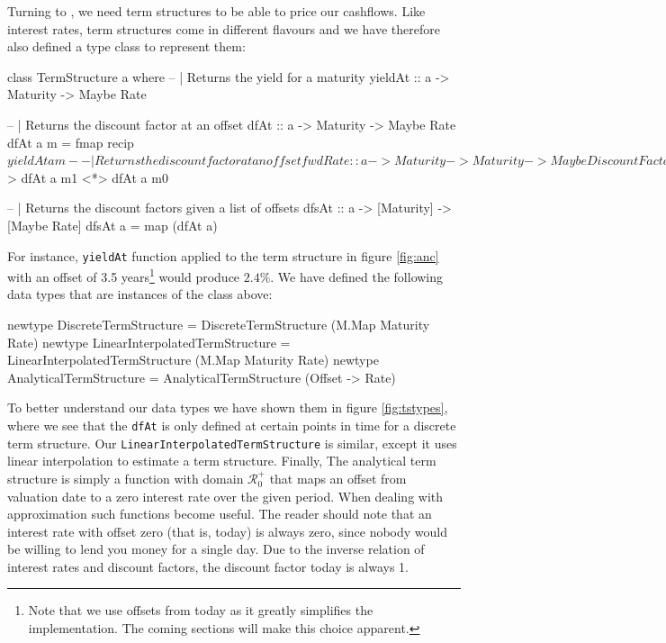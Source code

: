Turning to \hql, we need term structures to be able to price our cashflows.
Like interest rates, term structures come in different flavours and we 
have therefore also defined a type class to represent them:

\begin{hscode}
class TermStructure a where
  -- | Returns the yield for a maturity
  yieldAt :: a -> Maturity -> Maybe Rate

  -- | Returns the discount factor at an offset
  dfAt :: a -> Maturity -> Maybe Rate
  dfAt a m = fmap recip $ yieldAt a m
 
  -- | Returns the discount factor at an offset
  fwdRate :: a -> Maturity -> Maturity -> Maybe DiscountFactor
  fwdRate a m0 m1 = (/) <$> dfAt a m1 <*> dfAt a m0
  
  -- | Returns the discount factors given a list of offsets
  dfsAt :: a -> [Maturity] -> [Maybe Rate]
  dfsAt a = map (dfAt a)
\end{hscode}


For instance, \texttt{yieldAt} function applied to the term structure in
figure \ref{fig:anc} with an offset of 3.5 years\footnote{Note that we use
offsets from today as it greatly simplifies the implementation. The coming 
sections will make this choice apparent.} would produce $2.4\%$. We have
defined the following data types that are instances of the class above:

\begin{hscode}
newtype DiscreteTermStructure
  = DiscreteTermStructure (M.Map Maturity Rate)
newtype LinearInterpolatedTermStructure
  = LinearInterpolatedTermStructure (M.Map Maturity Rate)
newtype AnalyticalTermStructure
  = AnalyticalTermStructure (Offset -> Rate)
\end{hscode}

To better understand our data types we have shown them in figure \ref{fig:tstypes},
where we see that the \texttt{dfAt} is only defined at certain points in time for
a discrete term structure. Our \texttt{LinearInterpolatedTermStructure} is similar,
except it uses linear interpolation to estimate a term structure. 
Finally, The analytical term structure is simply a function with domain $\mathcal{R}^+_0$
that maps an offset from valuation date to a zero interest rate over the given
period. When dealing with approximation\cite{cmunk} such functions become useful.
The reader should note that an interest rate with offset zero (that is, today) is
always zero, since nobody would be willing to lend you money for a single day.
Due to the inverse relation of interest rates and discount factors, the discount factor
today is always 1.

